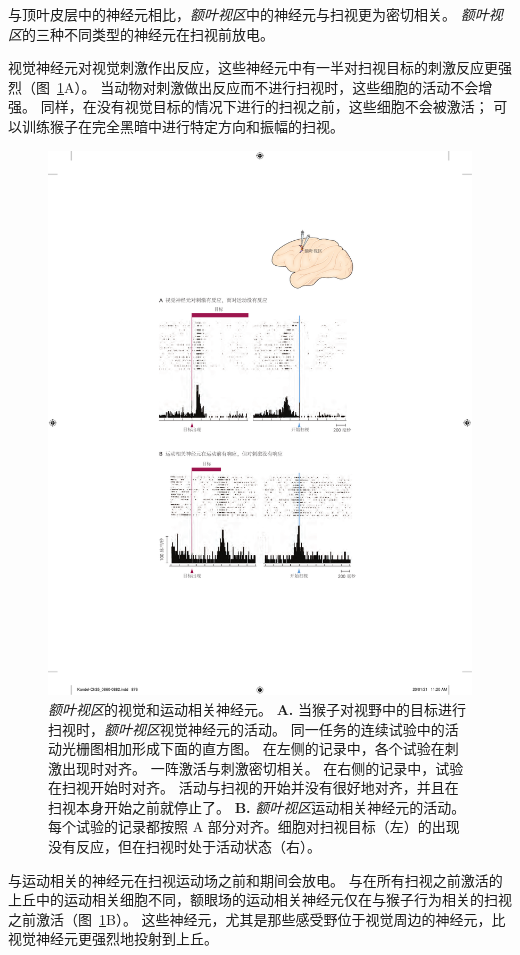 与顶叶皮层中的神经元相比，\textit{额叶视区}中的神经元与扫视更为密切相关。
\textit{额叶视区}的三种不同类型的神经元在扫视前放电。


视觉神经元对视觉刺激作出反应，这些神经元中有一半对扫视目标的刺激反应更强烈（图~\ref{fig:35_13}A）。
当动物对刺激做出反应而不进行扫视时，这些细胞的活动不会增强。
同样，在没有视觉目标的情况下进行的扫视之前，这些细胞不会被激活；
可以训练猴子在完全黑暗中进行特定方向和振幅的扫视。


\begin{figure}[htbp]
	\centering
	\includegraphics[width=0.8\linewidth]{chap35/fig_35_13}
	\caption{\textit{额叶视区}的视觉和运动相关神经元\cite{bruce1985primate}。
		\textbf{A.} 当猴子对视野中的目标进行扫视时，\textit{额叶视区}视觉神经元的活动。
		同一任务的连续试验中的活动光栅图相加形成下面的直方图。
		在左侧的记录中，各个试验在刺激出现时对齐。
		一阵激活与刺激密切相关。
		在右侧的记录中，试验在扫视开始时对齐。
		活动与扫视的开始并没有很好地对齐，并且在扫视本身开始之前就停止了。
		\textbf{B.} \textit{额叶视区}运动相关神经元的活动。
		每个试验的记录都按照 A 部分对齐。细胞对扫视目标（左）的出现没有反应，但在扫视时处于活动状态（右）。}
	\label{fig:35_13}
\end{figure}


与运动相关的神经元在扫视运动场之前和期间会放电。
与在所有扫视之前激活的上丘中的运动相关细胞不同，额眼场的运动相关神经元仅在与猴子行为相关的扫视之前激活（图~\ref{fig:35_13}B）。
这些神经元，尤其是那些感受野位于视觉周边的神经元，比视觉神经元更强烈地投射到上丘。


